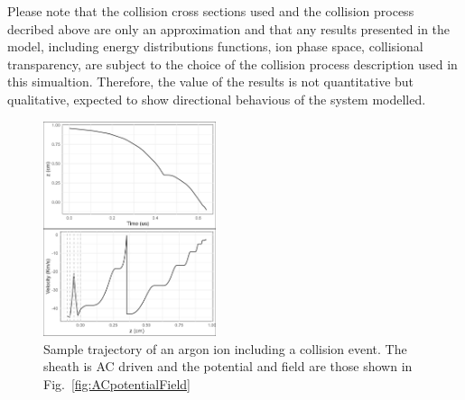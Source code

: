 Please note that the collision cross sections used and the collision process decribed above are only an approximation and that any results presented in the model, including energy distributions functions, ion phase space, collisional transparency, are subject to the choice of the collision process description used in this simualtion. Therefore, the value of the results is not quantitative but qualitative, expected to show directional behavious of the system modelled.  

\begin{figure}[htbp]
\centering
\includegraphics[width=0.45\textwidth]{Figures/ionTrajectory0.5Pa13.56MHz2kVStack2332.jpeg}
\caption{Sample trajectory of an argon ion including a collision event. The sheath is AC driven and the potential and field are those shown in Fig.~\ref{fig:ACpotentialField} }
\label{fig:CollisionACtrajectory}
\end{figure}
